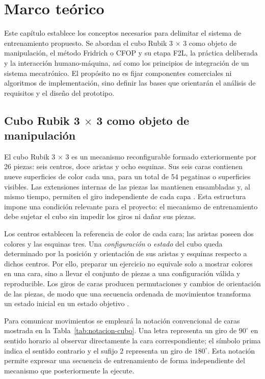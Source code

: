 \section{Marco teórico}

Este capítulo establece los conceptos necesarios para delimitar el sistema de entrenamiento propuesto. Se abordan el cubo Rubik 3 $\times$ 3 como objeto de manipulación, el método Fridrich o CFOP y su etapa F2L, la práctica deliberada y la interacción humano-máquina, así como los principios de integración de un sistema mecatrónico. El propósito no es fijar componentes comerciales ni algoritmos de implementación, sino definir las bases que orientarán el análisis de requisitos y el diseño del prototipo.

\subsection{Cubo Rubik 3 $\times$ 3 como objeto de manipulación}

El cubo Rubik 3 $\times$ 3 es un mecanismo reconfigurable formado exteriormente por 26 piezas: seis centros, doce aristas y ocho esquinas. Sus seis caras contienen nueve superficies de color cada una, para un total de 54 pegatinas o superficies visibles. Las extensiones internas de las piezas las mantienen ensambladas y, al mismo tiempo, permiten el giro independiente de cada capa \cite{Zeng2018}. Esta estructura impone una condición relevante para el proyecto: el mecanismo de entrenamiento debe sujetar el cubo sin impedir los giros ni dañar sus piezas.

Los centros establecen la referencia de color de cada cara; las aristas poseen dos colores y las esquinas tres. Una \emph{configuración} o \emph{estado} del cubo queda determinado por la posición y orientación de sus aristas y esquinas respecto a dichos centros. Por ello, preparar un ejercicio no equivale solo a mostrar colores en una cara, sino a llevar el conjunto de piezas a una configuración válida y reproducible. Los giros de caras producen permutaciones y cambios de orientación de las piezas, de modo que una secuencia ordenada de movimientos transforma un estado inicial en un estado objetivo \cite{Zeng2018}.

Para comunicar movimientos se empleará la notación convencional de caras mostrada en la Tabla~\ref{tab:notacion-cubo}. Una letra representa un giro de $90^{\circ}$ en sentido horario al observar directamente la cara correspondiente; el símbolo prima indica el sentido contrario y el sufijo $2$ representa un giro de $180^{\circ}$. Esta notación permite expresar una secuencia de entrenamiento de forma independiente del mecanismo que posteriormente la ejecute.

